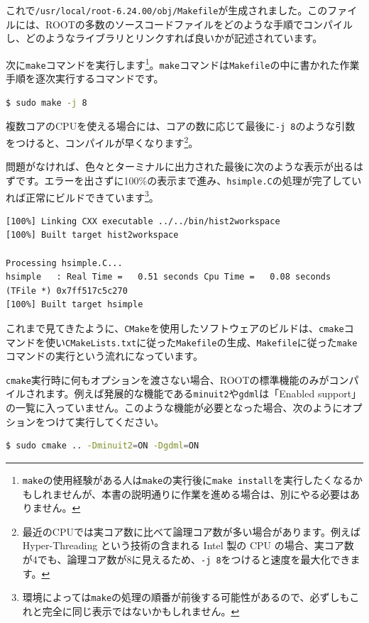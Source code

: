 {これで\texttt{/usr/local/root-6.24.00/obj/Makefile}が生成されました。このファイルには、ROOTの多数のソースコードファイルをどのような手順でコンパイルし、どのようなライブラリとリンクすれば良いかが記述されています。

次に\texttt{make}コマンドを実行します\footnote{\texttt{make}の使用経験がある人は\texttt{make}の実行後に\texttt{make install}を実行したくなるかもしれませんが、本書の説明通りに作業を進める場合は、別にやる必要はありません。}。\texttt{make}コマンドは\texttt{Makefile}の中に書かれた作業手順を逐次実行するコマンドです。
\begin{lstlisting}[language=bash]
$ sudo make -j 8
\end{lstlisting}
複数コアのCPUを使える場合には、コアの数に応じて最後に\texttt{-j 8}のような引数をつけると、コンパイルが早くなります\footnote{最近のCPUでは実コア数に比べて論理コア数が多い場合があります。例えば Hyper-Threading という技術の含まれる Intel 製の CPU の場合、実コア数が4でも、論理コア数が8に見えるため、\texttt{-j 8}をつけると速度を最大化できます。}。

問題がなければ、色々とターミナルに出力された最後に次のような表示が出るはずです。エラーを出さずに100\%の表示まで進み、\texttt{hsimple.C}の処理が完了していれば正常にビルドできています\footnote{環境によっては\texttt{make}の処理の順番が前後する可能性があるので、必ずしもこれと完全に同じ表示ではないかもしれません。}。
\begin{lstlisting}
[100%] Linking CXX executable ../../bin/hist2workspace
[100%] Built target hist2workspace

Processing hsimple.C...
hsimple   : Real Time =   0.51 seconds Cpu Time =   0.08 seconds
(TFile *) 0x7ff517c5c270
[100%] Built target hsimple
\end{lstlisting}

これまで見てきたように、\texttt{CMake}を使用したソフトウェアのビルドは、\texttt{cmake}コマンドを使い\texttt{CMakeLists.txt}に従った\texttt{Makefile}の生成、\texttt{Makefile}に従った\texttt{make}コマンドの実行という流れになっています。

\texttt{cmake}実行時に何もオプションを渡さない場合、ROOTの標準機能のみがコンパイルされます。例えば発展的な機能である\texttt{minuit2}や\texttt{gdml}は「Enabled support」の一覧に入っていません。このような機能が必要となった場合、次のようにオプションをつけて実行してください。

\begin{lstlisting}[language=bash]
$ sudo cmake .. -Dminuit2=ON -Dgdml=ON
\end{lstlisting}

}
